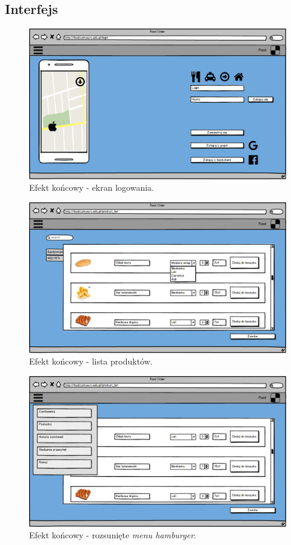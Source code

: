 \subsection{Interfejs}

\begin{figure}[H]
\centering
\includegraphics[width=15cm]{pictures/Logowanie_v2.png}
\caption{Efekt końcowy - ekran logowania.}
\end{figure}

\begin{figure}[H]
\centering
\includegraphics[width=15cm]{pictures/Lista_produktow_v3.png}
\caption{Efekt końcowy - lista produktów.}
\end{figure}

\begin{figure}[H]
\centering
\includegraphics[width=15cm]{pictures/Navbar_v1.png}
\caption{Efekt końcowy - rozsunięte \textit{menu hamburger}.}
\end{figure}

